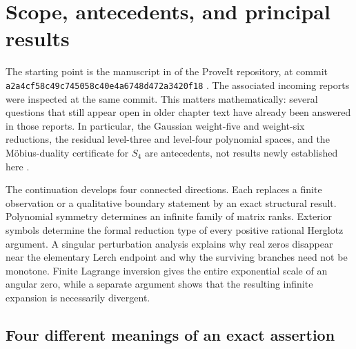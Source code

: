 \documentclass[11pt,a4paper]{article}
\theoremstyle{definition}
\theoremstyle{remark}
\numberwithin{equation}{section}
\begin{document}
\section{Scope, antecedents, and principal results}
\label{intro:sec:scope}

The starting point is the manuscript in
 of the ProveIt repository,
at commit \texttt{a2a4cf58c49c745058c40e4a6748d472a3420f18}
\cite{ProveItSnapshot}. The associated incoming reports were inspected
at the same commit. This matters mathematically: several questions that
still appear open in older chapter text have already been answered in
those reports. In particular, the Gaussian weight-five and weight-six
reductions, the residual level-three and level-four polynomial spaces,
and the Möbius-duality certificate for $S_4$ are antecedents, not results
newly established here \cite{PriorResearch,PriorRigidity}.

The continuation develops four connected directions. Each replaces a
finite observation or a qualitative boundary statement by an exact
structural result. Polynomial symmetry determines an infinite family of
matrix ranks. Exterior symbols determine the formal reduction type of
every positive rational Herglotz argument. A singular perturbation
analysis explains why real zeros disappear near the elementary Lerch
endpoint and why the surviving branches need not be monotone. Finite
Lagrange inversion gives the entire exponential scale of an angular
zero, while a separate argument shows that the resulting infinite
expansion is necessarily divergent.

\subsection{Four different meanings of an exact assertion}
\end{document}
